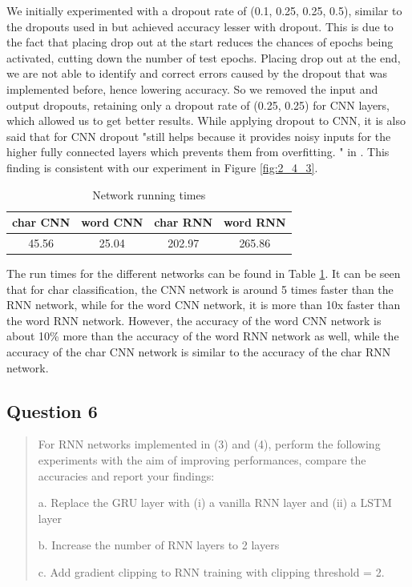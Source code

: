 We initially experimented with a dropout rate of (0.1, 0.25, 0.25, 0.5), similar to the dropouts used in \cite{srivastava2014dropout} but achieved accuracy lesser with dropout. This is due to the fact that placing drop out at the start reduces the chances of epochs being activated, cutting down the number of test epochs. Placing drop out at the end, we are not able to identify and correct errors caused by the dropout that was implemented before, hence lowering accuracy.  So we removed the input and output dropouts, retaining only a dropout rate of (0.25, 0.25) for CNN layers, which allowed us to get better results. While applying dropout to CNN, it is also said that for CNN dropout "still helps because it provides noisy inputs for the higher fully connected layers which prevents them from overfitting. " in \cite{srivastava2014dropout}. This finding is consistent with our experiment in Figure \ref{fig:2_4_3}.

\begin{table}[H]
\centering
\begin{tabular}{|c|c|c|c|}
\hline
\rowcolor[HTML]{85A4FF} 
char CNN & word CNN & char RNN & word RNN \\ \hline
45.56 & 25.04 & 202.97 & 265.86 \\ \hline
\end{tabular}
\caption{ Network running times}
\label{tab:run_time}
\end{table}

The run times for the different networks can be found in Table \ref{tab:run_time}. It can be seen that for char classification, the CNN network is around 5 times faster than the RNN network, while for the word CNN network, it is more than 10x faster than the word RNN network. However, the accuracy of the word CNN network is about 10\% more than the accuracy of the word RNN network as well, while the accuracy of the char CNN network is similar to the accuracy of the char RNN network.

\subsection{Question 6}
\begin{quote}
For RNN networks implemented in (3) and (4), perform the following experiments with the aim of improving performances, compare the accuracies and report your findings:

a. Replace the GRU layer with (i) a vanilla RNN layer and (ii) a LSTM layer

b. Increase the number of RNN layers to 2 layers

c. Add gradient clipping to RNN training with clipping threshold = 2. 
\end{quote}

